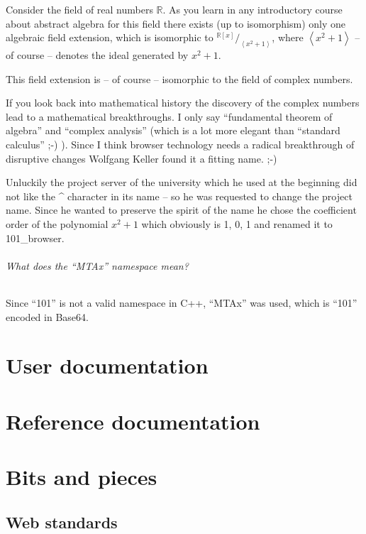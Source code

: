 \documentclass[10pt]{scrbook}
\begin{document}
Consider the field of real numbers $\mathbb{R}$. As you learn in any introductory course about abstract algebra for this field there exists (up to isomorphism) only one algebraic field extension, which is isomorphic to $^{\mathbb{R}[x]}/_{\left\langle x^2+1\right\rangle}$, where $\left\langle x^2+1\right\rangle$ -- of course -- denotes the ideal generated by $x^2+1$.

This field extension is -- of course -- isomorphic to the field of complex numbers.

If you look back into mathematical history the discovery of the complex numbers lead to a mathematical breakthroughs. I only say "`fundamental theorem of algebra"' and "`complex analysis"' (which is a lot more elegant than "`standard calculus"' ;-) ). Since I think browser technology needs a radical breakthrough of disruptive changes Wolfgang Keller found it a fitting name. ;-)

Unluckily the project server of the university which he used at the beginning did not like the \^{} character in its name -- so he was requested to change the project name. Since he wanted to preserve the spirit of the name he chose the coefficient order of the polynomial $x^2+1$ which obviously is 1, 0, 1 and renamed it to 101\_browser.

\paragraph{What does the "`MTAx"' namespace mean?}

Since "`101"' is not a valid namespace in C++, "`MTAx"' was used, which is "`101"' encoded in Base64.

\part{User documentation}

\part{Reference documentation}

\part{Bits and pieces}

\chapter{Web standards}
\end{document}
